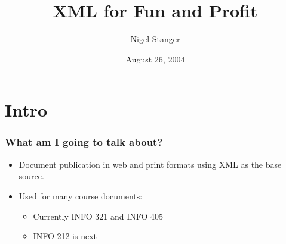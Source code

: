 %
%
%
%


\usepackage{beamerthemenzcs}
\usepackage{graphicx}
\usepackage{listings}


\renewcommand{\ttdefault}{blg}
\lstset{basicstyle=\ttfamily,showstringspaces=false}


\graphicspath{{images/}}



\footerright{\insertframenumber}

\author{Nigel Stanger}
\title{\textbf{XML for Fun and Profit}}
\date{August 26, 2004}





\frame{\titlepage}


\section*{Intro}


\frame
{
	\frametitle{What am I going to talk about?}
	
	\begin{itemize}
	
		\item Document publication in web and print formats using XML
		as the base source.
		
		\item Used for many course documents:
		
		\begin{itemize}
		
			\item Currently INFO 321 and INFO 405
			
			\item INFO 212 is next
			
		\end{itemize}
	
	\end{itemize}
}


